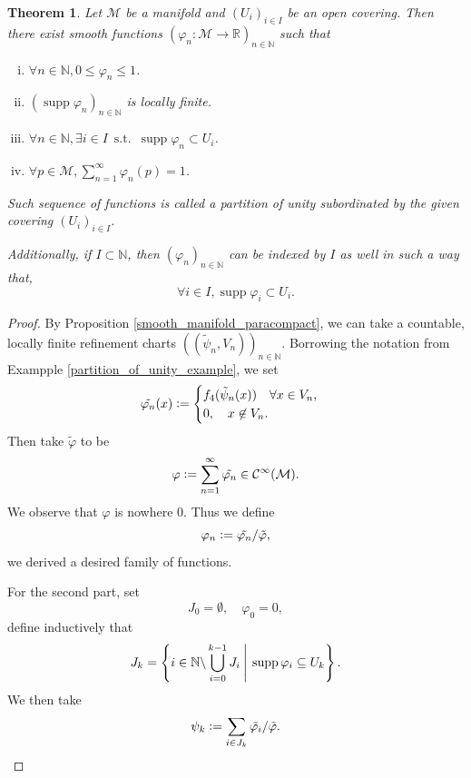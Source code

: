 \documentclass[8pt]{article}
\newtheorem{theorem}{Theorem} [section]
\DeclareMathOperator{\straw}{s.t.}
\DeclareMathOperator{\supp}{supp}
\newcommand{\defeq}{\vcentcolon=}
\newcommand{\N}[0]{\mathbb{N}}
\newcommand{\R}[0]{\mathbb{R}}
\newcommand{\st}[0]{\:\straw\:}
\begin{document}
\begin{theorem}
  Let $\mathcal{M}$ be a manifold and $(U_i)_{i\in I}$ be an open covering. Then there exist smooth functions $(\varphi_n:\mathcal{M}\to\R)_{n\in\N}$ such that 
  \begin{enumerate}[i).]
    \item $\forall n\in\N, 0\leq\varphi_n\leq 1$.
    \item $(\supp\varphi_n)_{n\in\N}$ is locally finite.
    \item $\forall n\in\N,\exists i\in I\st \supp\varphi_n\subset U_i$.
    \item $\forall p\in\mathcal{M}, \sum_{n=1}^\infty \varphi_n(p) = 1$. 
  \end{enumerate}
  Such sequence of functions is called a partition of unity subordinated by the given covering $(U_i)_{i\in I}$.
  \par Additionally, if $I\subset\N$, then $(\varphi_n)_{n\in\N}$ can be indexed by $I$ as well in such a way that,
  \begin{equation*}
    \forall i\in I, \supp\varphi_i \subset U_i.
  \end{equation*}
  \label{partition_of_unity_existence}
\end{theorem}
\begin{proof}
By Proposition \ref{smooth_manifold_paracompact}, we can take a countable, locally finite refinement charts $((\tilde{\psi}_n,V_n))_{n\in\N}$. Borrowing the notation from Exampple \ref{partition_of_unity_example}, we set 
\begin{equation*}
  \tilde{\varphi_n}(x) \defeq
  \begin{cases}
    f_4(\tilde{\psi}_n(x))\quad \forall x\in V_n,\\
    0,\quad x\not\in V_n.
  \end{cases}
\end{equation*}
Then take $\tilde{\varphi}$ to be 
\begin{equation*}
  \varphi\defeq \sum_{n=1}^\infty \tilde{\varphi_n}\in\mathcal{C}^\infty(\mathcal{M}).
\end{equation*}
We observe that $\varphi$ is nowhere $0$. Thus we define 
\begin{equation*}
  \varphi_n \defeq \tilde{\varphi_n}/\tilde{\varphi},
\end{equation*}
we derived a desired family of functions. 
\par For the second part, set 
\begin{equation*}
  J_0 = \emptyset,\quad \varphi_0 = 0,
\end{equation*}
define inductively that 
\begin{equation*}
  J_k = \left\{i\in\N\backslash\bigcup_{i=0}^{k-1}J_i\:\Bigg{|}\: \supp\varphi_i\subseteq U_k\right\}. 
\end{equation*}
We then take 
\begin{equation*}
  \psi_k \defeq \sum_{i\in J_k} \tilde{\varphi_i}/\tilde{\varphi}.
\end{equation*}
\end{proof}
\end{document}
